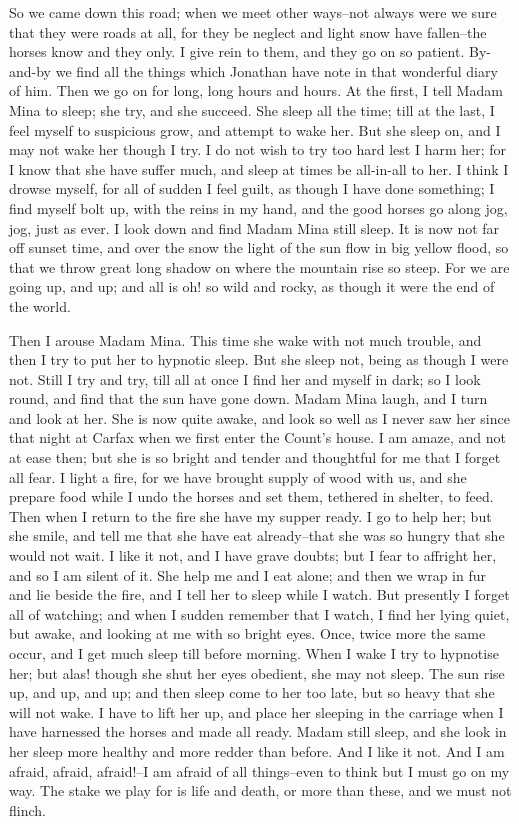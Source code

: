 \documentclass[12pt,openright]{book}
\begin{document}
So we came down this road; when we meet other ways–not always were we sure that they were roads at all, for they be neglect and light snow have fallen–the horses know and they only. I give rein to them, and they go on so patient. By-and-by we find all the things which Jonathan have note in that wonderful diary of him. Then we go on for long, long hours and hours. At the first, I tell Madam Mina to sleep; she try, and she succeed. She sleep all the time; till at the last, I feel myself to suspicious grow, and attempt to wake her. But she sleep on, and I may not wake her though I try. I do not wish to try too hard lest I harm her; for I know that she have suffer much, and sleep at times be all-in-all to her. I think I drowse myself, for all of sudden I feel guilt, as though I have done something; I find myself bolt up, with the reins in my hand, and the good horses go along jog, jog, just as ever. I look down and find Madam Mina still sleep. It is now not far off sunset time, and over the snow the light of the sun flow in big yellow flood, so that we throw great long shadow on where the mountain rise so steep. For we are going up, and up; and all is oh! so wild and rocky, as though it were the end of the world.

Then I arouse Madam Mina. This time she wake with not much trouble, and then I try to put her to hypnotic sleep. But she sleep not, being as though I were not. Still I try and try, till all at once I find her and myself in dark; so I look round, and find that the sun have gone down. Madam Mina laugh, and I turn and look at her. She is now quite awake, and look so well as I never saw her since that night at Carfax when we first enter the Count’s house. I am amaze, and not at ease then; but she is so bright and tender and thoughtful for me that I forget all fear. I light a fire, for we have brought supply of wood with us, and she prepare food while I undo the horses and set them, tethered in shelter, to feed. Then when I return to the fire she have my supper ready. I go to help her; but she smile, and tell me that she have eat already–that she was so hungry that she would not wait. I like it not, and I have grave doubts; but I fear to affright her, and so I am silent of it. She help me and I eat alone; and then we wrap in fur and lie beside the fire, and I tell her to sleep while I watch. But presently I forget all of watching; and when I sudden remember that I watch, I find her lying quiet, but awake, and looking at me with so bright eyes. Once, twice more the same occur, and I get much sleep till before morning. When I wake I try to hypnotise her; but alas! though she shut her eyes obedient, she may not sleep. The sun rise up, and up, and up; and then sleep come to her too late, but so heavy that she will not wake. I have to lift her up, and place her sleeping in the carriage when I have harnessed the horses and made all ready. Madam still sleep, and she look in her sleep more healthy and more redder than before. And I like it not. And I am afraid, afraid, afraid!–I am afraid of all things–even to think but I must go on my way. The stake we play for is life and death, or more than these, and we must not flinch.
\end{document}
